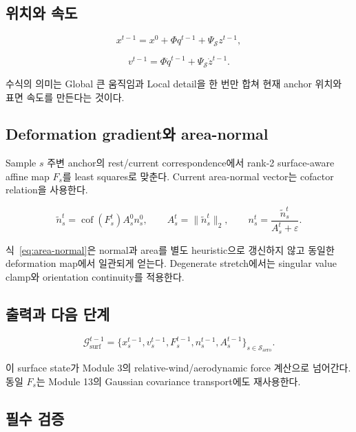 \documentclass[11pt,a4paper]{article}
\newcommand{\eps}{\varepsilon}
\newcommand{\cof}{\operatorname{cof}}
\begin{document}
\subsection*{위치와 속도}

\begin{equation}
  x^{t-1}=x^0+\Phi q^{t-1}+\Psi_{\mathcal S}z^{t-1},
\end{equation}

\begin{equation}
  v^{t-1}=\Phi\dot q^{t-1}+\Psi_{\mathcal S}\dot z^{t-1}.
\end{equation}

수식의 의미는 Global 큰 움직임과 Local detail을 한 번만 합쳐
현재 anchor 위치와 표면 속도를 만든다는 것이다.

\subsection*{Deformation gradient와 area-normal}

Sample \(s\) 주변 anchor의 rest/current correspondence에서
rank-2 surface-aware affine map \(F_s\)를 least squares로 맞춘다.
Current area-normal vector는 cofactor relation을 사용한다.

\begin{equation}
  \widetilde n_s^t
  =
  \cof(F_s^t) A_s^0 n_s^0,
  \qquad
  A_s^t=\|\widetilde n_s^t\|_2,
  \qquad
  n_s^t=\frac{\widetilde n_s^t}{A_s^t+\eps}.
  \label{eq:area-normal}
\end{equation}

식~\eqref{eq:area-normal}은 normal과 area를 별도 heuristic으로 갱신하지 않고
동일한 deformation map에서 일관되게 얻는다.
Degenerate stretch에서는 singular value clamp와 orientation continuity를 적용한다.

\subsection*{출력과 다음 단계}

\begin{equation}
  \mathcal G_{\mathrm{surf}}^{t-1}
  =
  \{x_s^{t-1},v_s^{t-1},F_s^{t-1},n_s^{t-1},A_s^{t-1}\}_{s\in\mathcal S_{\mathrm{aero}}}.
\end{equation}

이 surface state가 Module 3의 relative-wind/aerodynamic force 계산으로 넘어간다.
동일 \(F_s\)는 Module 13의 Gaussian covariance transport에도 재사용한다.

\subsection*{필수 검증}
\end{document}

